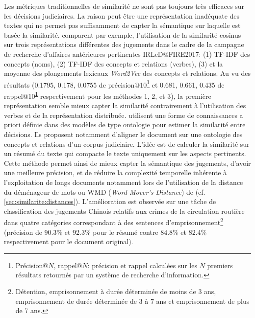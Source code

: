 Les métriques traditionnelles de similarité ne sont pas toujours très efficaces sur les décisions judiciaires. La raison peut être une représentation inadéquate des textes qui ne permet pas suffisamment de capter
la sémantique sur laquelle est basée la similarité. \citet{thenmozhi2017legalprecedretriev} comparent par exemple, l'utilisation de la similarité cosinus sur trois représentations différentes des jugements dans le cadre de la campagne de recherche d'affaires antérieures pertinentes  IRLeD@FIRE2017\citep{mandal2017IRLeD@FIRE2017}: (1) TF-IDF des concepts (noms), (2) TF-IDF des concepts et relations (verbes), (3) et la moyenne des plongements lexicaux \textit{Word2Vec} \citep{lemikolov2014word2vec} des concepts et relations. Au vu des résultats (0.1795, 0.178, 0.0755 de précision@10\footnote{\label{footnote:literature:PR_at_N} Précision@$N$, rappel@$N$: précision et rappel calculées sur les $N$ premiers résultats retournés par un système de recherche d'information.} et 0.681, 0.661, 0.435 de rappel@10\textsuperscript{\ref{footnote:literature:PR_at_N}} respectivement pour les méthodes 1, 2, et 3), la première représentation semble mieux capter la similarité contrairement à l'utilisation des verbes et de la représentation distribuée.  %
 \citet{ma2018wmdchinesecase} utilisent une forme de connaissances a priori définie dans des modèles de type ontologie pour estimer la similarité entre décisions. Ils proposent notamment d'aligner le document sur une ontologie des concepts et relations d'un corpus judiciaire. L'idée est de calculer la similarité sur un résumé du texte qui compacte le texte uniquement sur les aspects pertinents. Cette méthode permet ainsi de mieux capter la sémantique des jugements, d'avoir une meilleure précision, et de réduire la complexité temporelle inhérente à l'exploitation de longs documents notamment lors de l'utilisation de la \og distance du déménageur de mots \fg{} ou WMD (\textit{Word Mover's Distance}) de \citet{kusner2015wordmoverdist} (cf. \ref{sec:similarite:distances}). L'amélioration est observée sur une tâche de classification des jugements Chinois relatifs aux crimes de la circulation routière dans quatre catégories correspondant à des sentences d'emprisonnement\footnote{Détention, emprisonnement à durée déterminée de moins de 3 ans, emprisonnement de durée déterminée de 3 à 7 ans et emprisonnement de plus de 7 ans.} (précision de 90.3\% et 92.3\% pour le résumé contre 84.8\% et 82.4\% respectivement pour le document original). 

